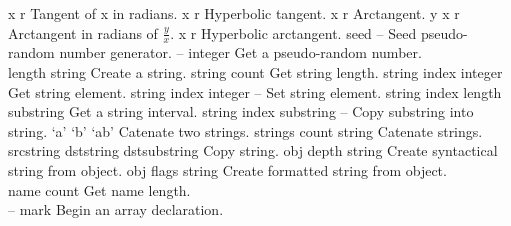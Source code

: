 \begin{longtable}{}
\hline
\optableent
	{x}
	{{\bf {}}}
	{r}
	{Tangent of x in radians.}
\hline
\optableent
	{x}
	{{\bf {}}}
	{r}
	{Hyperbolic tangent.}
\hline
\optableent
	{x}
	{{\bf {}}}
	{r}
	{Arctangent.}
\hline
\optableent
	{y x}
	{{\bf {}}}
	{r}
	{Arctangent in radians of $\frac{y}{x}$.}
\hline
\optableent
	{x}
	{{\bf {}}}
	{r}
	{Hyperbolic arctangent.}
\hline
\optableent
	{seed}
	{{\bf {}}}
	{--}
	{Seed pseudo-random number generator.}
\hline
\optableent
	{--}
	{{\bf {}}}
	{integer}
	{Get a pseudo-random number.}
\hline \hline
{} \\
\hline \hline
\optableent
	{length}
	{{\bf {}}}
	{string}
	{Create a string.}
\hline
\optableent
	{string}
	{{\bf {}}}
	{count}
	{Get string length.}
\hline
\optableent
	{string index}
	{{\bf {}}}
	{integer}
	{Get string element.}
\hline
\optableent
	{string index integer}
	{{\bf {}}}
	{--}
	{Set string element.}
\hline
\optableent
	{string index length}
	{{\bf {}}}
	{substring}
	{Get a string interval.}
\hline
\optableent
	{string index substring}
	{{\bf {}}}
	{--}
	{Copy substring into string.}
\hline
\optableent
	{`a' `b'}
	{{\bf {}}}
	{`ab'}
	{Catenate two strings.}
\hline
\optableent
	{strings count}
	{{\bf {}}}
	{string}
	{Catenate strings.}
\hline
\optableent
	{srcstring dststring}
	{{\bf {}}}
	{dstsubstring}
	{Copy string.}
\hline
\optableent
	{obj depth}
	{{\bf {}}}
	{string}
	{Create syntactical string from object.}
\hline
\optableent
	{obj flags}
	{{\bf {}}}
	{string}
	{Create formatted string from object.}
\hline \hline
{} \\
\hline \hline
\optableent
	{name}
	{{\bf {}}}
	{count}
	{Get name length.}
\hline \hline
{} \\
\hline \hline
\optableent
	{--}
	{{\bf \htmlref{[}{systemdict:sym_lb}}}
	{mark}
	{Begin an array declaration.}

\end{longtable}
